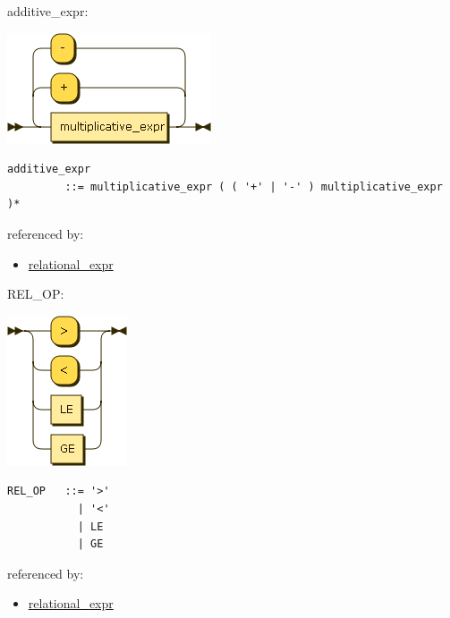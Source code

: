 \begin{minipage}{\textwidth}
\protect\hypertarget{additive_expr}{}{additive\_expr:}

\includegraphics[width=2.37500in,height=1.29167in]{diagram/additive_expr.png}

\begin{verbatim}
additive_expr
         ::= multiplicative_expr ( ( '+' | '-' ) multiplicative_expr )*
\end{verbatim}

referenced by:

\begin{itemize}
\tightlist
\item
  \protect\hyperlink{relational_expr}{relational\_expr}
\end{itemize}

\end{minipage}

\begin{minipage}{\textwidth}
\protect\hypertarget{REL_OP}{}{REL\_OP:}

\includegraphics[width=1.39583in,height=1.75000in]{diagram/REL_OP.png}

\begin{verbatim}
REL_OP   ::= '>'
           | '<'
           | LE
           | GE
\end{verbatim}

referenced by:

\begin{itemize}
\tightlist
\item
  \protect\hyperlink{relational_expr}{relational\_expr}
\end{itemize}

\end{minipage}

